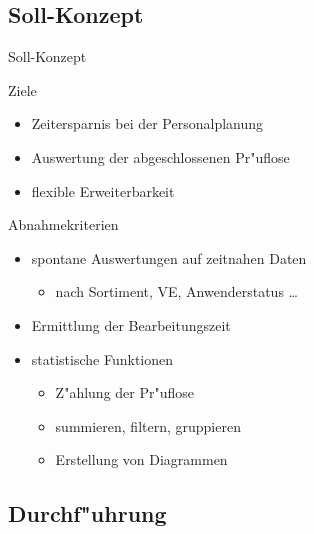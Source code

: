 \subsection{Soll-Konzept}
\begin{frame}[<+->]{Soll-Konzept}
	\begin{block}{Ziele}
		\begin{itemize}
			\item Zeitersparnis bei der Personalplanung
			\item Auswertung der abgeschlossenen Pr"uflose
			\item flexible Erweiterbarkeit
		\end{itemize}
	\end{block}
	\begin{block}{Abnahmekriterien}
		\begin{itemize}
			\item{spontane Auswertungen auf zeitnahen Daten
			\begin{itemize}
				\item nach Sortiment, VE, Anwenderstatus \ldots
			\end{itemize} }
			\item Ermittlung der Bearbeitungszeit
			\item{statistische Funktionen
			\begin{itemize}
				\item Z"ahlung der Pr"uflose
				\item summieren, filtern, gruppieren
				\item Erstellung von Diagrammen
			\end{itemize} }
		\end{itemize}
	\end{block}
\end{frame}


\subsection{Durchf"uhrung}

